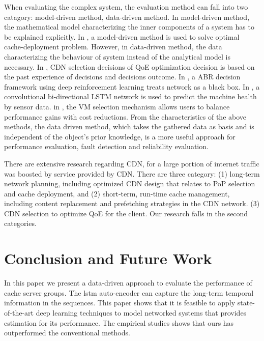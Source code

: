 \documentclass[5p]{elsarticle}
\begin{document}
When evaluating the complex system, the evaluation method can fall into two catagory: model-driven method, data-driven method. In model-driven method, the mathematical model characterizing the inner components of a system has to be explained explicitly. In \cite{Tang2017RethinkingDemands}, a model-driven method is used to solve optimal cache-deployment problem. However, in data-driven method, the data characterizing the behaviour of system instead of the analytical model is necessary. In \cite{Jiang2017Pytheas:Exploration-Exploitation}, CDN selection decisions of QoE optimization decision is based on the past experience of decisions and decisions outcome. In \cite{Mao2017NeuralPensieve}, a ABR decision framework using deep reinforcement learning treats network as a black box. In \cite{Zhao2017LearningNetworks}, a convolutional bi-directional LSTM network is used to predict the machine health by sensor data. in \cite{Yadwadkar2017SelectingClouds}, the VM selection mechanism allows users to balance performance gains with cost reductions. From the characteristics of the above methods, the data driven method, which takes the gathered data as basis and is independent of the object’s prior knowledge, is a more useful approach for performance evaluation, fault detection and reliability evaluation.

There are extensive research regarding CDN, for a large portion of internet traffic was boosted by service provided by CDN. There are three category: (1) long-term network planning, including optimized CDN design that relates to PoP selection and cache deployment\cite{Krishnan2000}\cite{Hasan2014}\cite{Tang2017RethinkingDemands}, and (2) short-term, run-time cache management, including content replacement and prefetching strategies in the CDN network\cite{Borst2010}\cite{Leconte2016}\cite{Applegate2016}. (3) CDN selection to optimize QoE for the client\cite{Jiang2017Pytheas:Exploration-Exploitation}\cite{JiangCFA:Optimization}. Our research falls in the second categories.

\section{Conclusion and Future Work}

In this paper we present a data-driven approach to evaluate the performance of cache server groups. The lstm auto-encoder can capture the long-term temporal information in the sequences. This paper shows that it is feasible to apply state-of-the-art deep learning techniques to model networked systems that provides estimation for its performance. The empirical studies shows that ours has outperformed the conventional methods.
\end{document}

